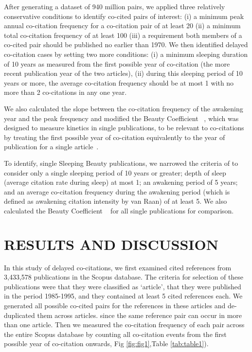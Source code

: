 \documentclass[utf8]{frontiersSCNS}
\begin{document}
After generating a dataset of 940 million pairs, we applied three relatively conservative conditions to identify co-cited pairs of interest: (i) a minimum peak annual co-citation frequency for a co-citation pair of at least 20 (ii) a minimum total co-citation frequency of at least 100 (iii) a requirement both members of a co-cited pair should be published no earlier than 1970. We then identified delayed co-citation cases by setting two more conditions: (i) a minimum sleeping duration of 10 years as measured from the first possible year of co-citation (the more recent publication year of the two articles), (ii) during this sleeping period of 10 years or more, the average co-citation frequency should be at most 1 with no more than 2 co-citations in any one year. 

We also calculated the slope between the co-citation frequency of the awakening year and the peak frequency and modified the Beauty Coefficient ~\citep{Ke2015,devarakonda_2020}, which was designed to measure kinetics in single publications, to be relevant to co-citations by treating the first possible year of co-citation equivalently to the year of publication for a single article~\citep{devarakonda_2020}. 

To identify, single Sleeping Beauty publications, we narrowed the criteria of \cite{Raan2019} to consider only a single sleeping period of 10 years or greater; depth of sleep (average citation rate during sleep) at most 1; an awakening period of 5 years; and an average co-citation frequency during the awakening period (which is defined as awakening citation intensity by van Raan) of at least 5. We also calculated the Beauty Coefficient ~\citep{Ke2015} for all single publications for comparison.

\section{RESULTS AND DISCUSSION}

In this study of delayed co-citations, we first examined cited references from 3,433,578 publications in the Scopus database. The criteria for selection of these publications were that they were classified as `article', that they were published in the period 1985-1995, and they contained at least 5 cited references each. We generated all possible co-cited pairs for the references in these articles and de-duplicated them across articles. since the same reference pair can occur in more than one article. Then we measured the co-citation frequency of each pair across the entire Scopus database by counting all co-citation events from the first possible year of co-citation onwards, Fig \ref{fig:fig1},Table \ref{tab:table1}).
\end{document}
